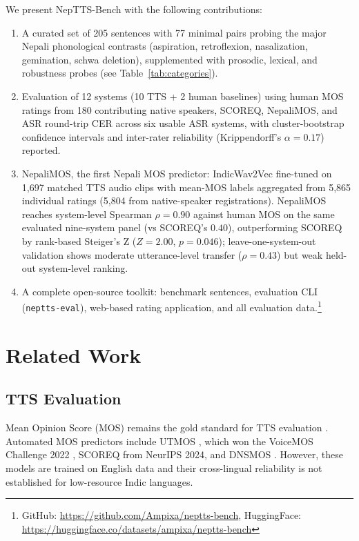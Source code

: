 \documentclass[11pt]{article}
\begin{document}
We present NepTTS-Bench with the following contributions:

\begin{enumerate}
\item A curated set of 205 sentences with 77 minimal pairs probing the major Nepali phonological contrasts (aspiration, retroflexion, nasalization, gemination, schwa deletion), supplemented with prosodic, lexical, and robustness probes (see Table~\ref{tab:categories}).
\item Evaluation of 12 systems (10 TTS + 2 human baselines) using human MOS ratings from 180 contributing native speakers, SCOREQ, NepaliMOS, and ASR round-trip CER across six usable ASR systems, with cluster-bootstrap confidence intervals and inter-rater reliability (Krippendorff's $\alpha = 0.17$) reported.
\item NepaliMOS, the first Nepali MOS predictor: IndicWav2Vec fine-tuned on 1{,}697 matched TTS audio clips with mean-MOS labels aggregated from 5{,}865 individual ratings (5{,}804 from native-speaker registrations). NepaliMOS reaches system-level Spearman $\rho = 0.90$ against human MOS on the same evaluated nine-system panel (vs SCOREQ's $0.40$), outperforming SCOREQ by rank-based Steiger's Z ($Z=2.00$, $p = 0.046$); leave-one-system-out validation shows moderate utterance-level transfer ($\rho = 0.43$) but weak held-out system-level ranking.
\item A complete open-source toolkit: benchmark sentences, evaluation CLI (\texttt{neptts-eval}), web-based rating application, and all evaluation data.\footnote{GitHub: \url{https://github.com/Ampixa/neptts-bench}, HuggingFace: \url{https://huggingface.co/datasets/ampixa/neptts-bench}}
\end{enumerate}


\section{Related Work}

\subsection{TTS Evaluation}
Mean Opinion Score (MOS) remains the gold standard for TTS evaluation \citep{streijl2016mos}. Automated MOS predictors include UTMOS \citep{saeki2022utmos}, which won the VoiceMOS Challenge 2022 \citep{huang2022voicemos}, SCOREQ \citep{ragano2024scoreq} from NeurIPS 2024, and DNSMOS \citep{reddy2022dnsmos}. However, these models are trained on English data and their cross-lingual reliability is not established for low-resource Indic languages.
\end{document}
